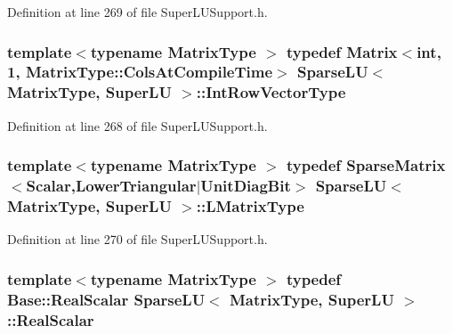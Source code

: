 Definition at line 269 of file Super\-L\-U\-Support.\-h.

\hypertarget{class_sparse_l_u_3_01_matrix_type_00_01_super_l_u_01_4_a341f04a651379c2395a17abc5a566ccf}{
\subsubsection[{Int\-Row\-Vector\-Type}]{\setlength{\rightskip}{0pt plus 5cm}template$<$typename Matrix\-Type $>$ typedef {\bf Matrix}$<${\bf int}, 1, Matrix\-Type\-::\-Cols\-At\-Compile\-Time$>$ {\bf Sparse\-L\-U}$<$ Matrix\-Type, {\bf Super\-L\-U} $>$\-::{\bf Int\-Row\-Vector\-Type}\hspace{0.3cm}{\ttfamily [protected]}}}\label{class_sparse_l_u_3_01_matrix_type_00_01_super_l_u_01_4_a341f04a651379c2395a17abc5a566ccf}


Definition at line 268 of file Super\-L\-U\-Support.\-h.

\hypertarget{class_sparse_l_u_3_01_matrix_type_00_01_super_l_u_01_4_a456d27de5a655bef64e8d749e80e3aad}{
\subsubsection[{L\-Matrix\-Type}]{\setlength{\rightskip}{0pt plus 5cm}template$<$typename Matrix\-Type $>$ typedef {\bf Sparse\-Matrix}$<${\bf Scalar},{\bf Lower\-Triangular}$|${\bf Unit\-Diag\-Bit}$>$ {\bf Sparse\-L\-U}$<$ Matrix\-Type, {\bf Super\-L\-U} $>$\-::{\bf L\-Matrix\-Type}\hspace{0.3cm}{\ttfamily [protected]}}}\label{class_sparse_l_u_3_01_matrix_type_00_01_super_l_u_01_4_a456d27de5a655bef64e8d749e80e3aad}


Definition at line 270 of file Super\-L\-U\-Support.\-h.

\hypertarget{class_sparse_l_u_3_01_matrix_type_00_01_super_l_u_01_4_aa3cef21ac23d8f5ffe8709bc9178ab23}{
\subsubsection[{Real\-Scalar}]{\setlength{\rightskip}{0pt plus 5cm}template$<$typename Matrix\-Type $>$ typedef {\bf Base\-::\-Real\-Scalar} {\bf Sparse\-L\-U}$<$ Matrix\-Type, {\bf Super\-L\-U} $>$\-::{\bf Real\-Scalar}\hspace{0.3cm}{\ttfamily [protected]}}}\label{class_sparse_l_u_3_01_matrix_type_00_01_super_l_u_01_4_aa3cef21ac23d8f5ffe8709bc9178ab23}



